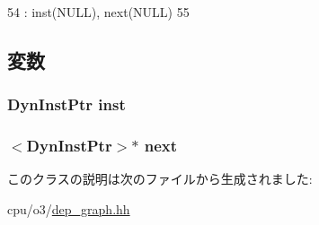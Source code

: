 \begin{DoxyCode}
54         : inst(NULL), next(NULL)
55     { }
\end{DoxyCode}


\subsection{変数}
\hypertarget{classDependencyEntry_af5d4fb974eeb4507d4c837d365d0cefc}{
\subsubsection[{inst}]{\setlength{\rightskip}{0pt plus 5cm}DynInstPtr {\bf inst}}}
\label{classDependencyEntry_af5d4fb974eeb4507d4c837d365d0cefc}
\hypertarget{classDependencyEntry_a8e52e096475018c4b11a52dc63a23a02}{
\subsubsection[{next}]{$<$DynInstPtr$>$$\ast$ {\bf next}}}
\label{classDependencyEntry_a8e52e096475018c4b11a52dc63a23a02}


このクラスの説明は次のファイルから生成されました:\begin{DoxyCompactItemize}
\item 
cpu/o3/\hyperlink{dep__graph_8hh}{dep\_\-graph.hh}\end{DoxyCompactItemize}
